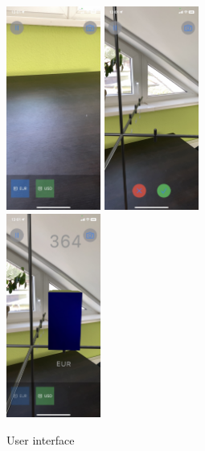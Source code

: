 \begin{figure}[!ht]
    \centering
    \includegraphics[height=67mm, keepaspectratio]{../images/selector.jpeg}\hspace{1cm}
    \includegraphics[height=67mm, keepaspectratio]{../images/megerosites.jpeg}\\\vspace{5mm}
    \includegraphics[height=67mm, keepaspectratio]{../images/not_available.jpeg}%
    \caption{User interface}
    \label{fig:HVSpaces}
\end{figure}

